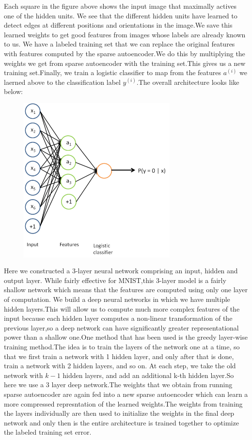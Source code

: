 \documentclass[18pt,letterpaper]{article}
\begin{document}
Each square in the figure above shows the input image that maximally actives one of the hidden units. We see that the different hidden units have learned to detect edges at different positions and orientations in the image.We save this learned weights to get good features from images whose labels are already known to us.
We have a labeled training set that we can replace the original features with features computed by the sparse autoencoder.We do this by multiplying the weights we get from sparse autoencoder with the training set.This gives us a new training set.Finally, we train a logistic classifier to map from the features $a^{(i)}$ we laerned above to the classification label $y^{(i)}$.The overall architecture looks like below:  
\begin{figure}[ht!]
\includegraphics[width=8cm]{7.png}
\end{figure}

Here we constructed a 3-layer neural network comprising an input, hidden and output layer. While fairly effective for MNIST,this 3-layer model is a fairly shallow network which means that the features are computed using only one layer of computation.
We build a deep neural networks in which we have multiple hidden layers.This will allow us to compute much more complex features of the input because each hidden layer computes a non-linear transformation of the previous layer,so a deep network can have significantly greater representational power than a shallow one.One method that has been used is the greedy layer-wise training method.The idea is to train the layers of the network one at a time, so that we first train a network with 1 hidden layer, and only after that is done, train a network with 2 hidden layers, and so on. At each step, we take the old network with $k\mathbin{-}1$ hidden layers, and add an additional k-th hidden layer.So here we use a 3 layer deep network.The weights that we obtain from running sparse autoencoder are again fed into a new sparse autoencoder which can learn a more compressed represntation of the learned weights.The weights from training the layers individually are then used to initialize the weights in the final deep network and only then is the entire architecture is trained together to optimize the labeled training set error.
\end{document}
